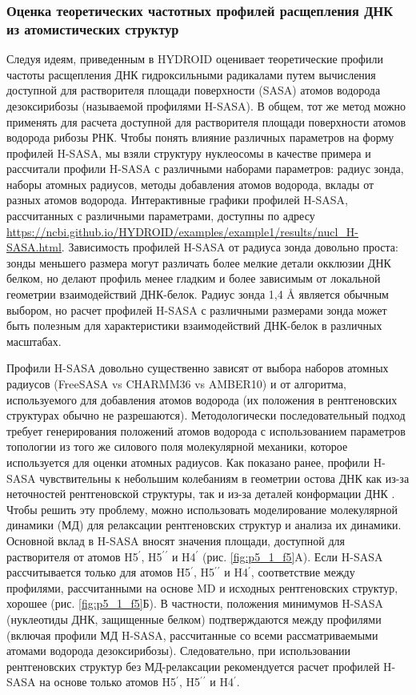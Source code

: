     \subsubsection{Оценка теоретических частотных профилей расщепления ДНК из атомистических структур}
    Следуя идеям, приведенным в \cite{balasubramanian_dna_1998} HYDROID оценивает теоретические профили частоты расщепления ДНК гидроксильными радикалами путем вычисления доступной для растворителя площади поверхности (SASA) атомов водорода дезоксирибозы (называемой профилями H-SASA). В общем, тот же метод можно применять для расчета доступной для растворителя площади поверхности атомов водорода рибозы РНК. Чтобы понять влияние различных параметров на форму профилей H-SASA, мы взяли структуру нуклеосомы в качестве примера и рассчитали профили H-SASA с различными наборами параметров: радиус зонда, наборы атомных радиусов, методы добавления атомов водорода, вклады от разных атомов водорода. Интерактивные графики профилей H-SASA, рассчитанных с различными параметрами, доступны по адресу  \url{https://ncbi.github.io/HYDROID/examples/example1/results/nucl_H-SASA.html}. Зависимость профилей H-SASA от радиуса зонда довольно проста: зонды меньшего размера могут различать более мелкие детали окклюзии ДНК белком, но делают профиль менее гладким и более зависимым от локальной геометрии взаимодействий ДНК-белок. Радиус зонда 1,4 \AA{} является обычным выбором, но расчет профилей H-SASA с различными размерами зонда может быть полезным для характеристики взаимодействий ДНК-белок в различных масштабах.
    
    Профили H-SASA довольно существенно зависят от выбора наборов атомных радиусов (FreeSASA vs CHARMM36 vs AMBER10) и от алгоритма, используемого для добавления атомов водорода (их положения в рентгеновских структурах обычно не разрешаются). Методологически последовательный подход требует генерирования положений атомов водорода с использованием параметров топологии из того же силового поля молекулярной механики, которое используется для оценки атомных радиусов. Как показано ранее, профили H-SASA чувствительны к небольшим колебаниям в геометрии остова ДНК как из-за неточностей рентгеновской структуры, так и из-за деталей конформации ДНК \cite{shaytan_hydroxyl-radical_2017}. Чтобы решить эту проблему, можно использовать моделирование молекулярной динамики (МД) для релаксации рентгеновских структур и анализа их динамики.  Основной вклад в H-SASA вносят значения площади, доступной для растворителя от атомов H5$^\prime$, H5$^\prime$$^\prime$ и H4$^\prime$ (рис. \ref{fig:p5_1_f5}A). Если H-SASA рассчитывается только для атомов H5$^\prime$, H5$^\prime$$^\prime$ и H4$^\prime$, соответствие между профилями, рассчитанными на основе MD и исходных рентгеновских структур, хорошее (рис. \ref{fig:p5_1_f5}Б). В частности, положения минимумов H-SASA (нуклеотиды ДНК, защищенные белком) подтверждаются между профилями (включая профили МД H-SASA, рассчитанные со всеми рассматриваемыми атомами водорода дезоксирибозы). Следовательно, при использовании рентгеновских структур без МД-релаксации рекомендуется расчет профилей H-SASA на основе только атомов H5$^\prime$, H5$^\prime$$^\prime$ и H4$^\prime$.
    
